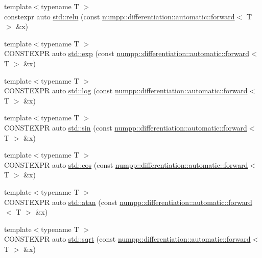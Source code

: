 \begin{DoxyCompactItemize}
\item 
{\footnotesize template$<$typename T $>$ }\\constexpr auto \hyperlink{group__numpp__differentiation__forward__automatic_ga2faff4e6f917370493a6c12f947e2573}{std\+::relu} (const \hyperlink{classnumpp_1_1differentiation_1_1automatic_1_1forward}{numpp\+::differentiation\+::automatic\+::forward}$<$ T $>$ \&x)
\item 
{\footnotesize template$<$typename T $>$ }\\C\+O\+N\+S\+T\+E\+X\+PR auto \hyperlink{group__numpp__differentiation__forward__automatic_gab45ba058e4fd16d0f9f4c26426e385f9}{std\+::exp} (const \hyperlink{classnumpp_1_1differentiation_1_1automatic_1_1forward}{numpp\+::differentiation\+::automatic\+::forward}$<$ T $>$ \&x)
\item 
{\footnotesize template$<$typename T $>$ }\\C\+O\+N\+S\+T\+E\+X\+PR auto \hyperlink{group__numpp__differentiation__forward__automatic_ga0f6011595edffe756a984de60358fe5f}{std\+::log} (const \hyperlink{classnumpp_1_1differentiation_1_1automatic_1_1forward}{numpp\+::differentiation\+::automatic\+::forward}$<$ T $>$ \&x)
\item 
{\footnotesize template$<$typename T $>$ }\\C\+O\+N\+S\+T\+E\+X\+PR auto \hyperlink{group__numpp__differentiation__forward__automatic_ga6f6f07250087b18ada9ea1f84418f24f}{std\+::sin} (const \hyperlink{classnumpp_1_1differentiation_1_1automatic_1_1forward}{numpp\+::differentiation\+::automatic\+::forward}$<$ T $>$ \&x)
\item 
{\footnotesize template$<$typename T $>$ }\\C\+O\+N\+S\+T\+E\+X\+PR auto \hyperlink{group__numpp__differentiation__forward__automatic_gaa5a06320f93037d94fda441546d7d690}{std\+::cos} (const \hyperlink{classnumpp_1_1differentiation_1_1automatic_1_1forward}{numpp\+::differentiation\+::automatic\+::forward}$<$ T $>$ \&x)
\item 
{\footnotesize template$<$typename T $>$ }\\C\+O\+N\+S\+T\+E\+X\+PR auto \hyperlink{group__numpp__differentiation__forward__automatic_ga9547d13665c214d44b017b140ccc1a3e}{std\+::atan} (const \hyperlink{classnumpp_1_1differentiation_1_1automatic_1_1forward}{numpp\+::differentiation\+::automatic\+::forward}$<$ T $>$ \&x)
\item 
{\footnotesize template$<$typename T $>$ }\\C\+O\+N\+S\+T\+E\+X\+PR auto \hyperlink{group__numpp__differentiation__forward__automatic_ga9c142d0a384bfa6e79bf6f614c98fe1d}{std\+::sqrt} (const \hyperlink{classnumpp_1_1differentiation_1_1automatic_1_1forward}{numpp\+::differentiation\+::automatic\+::forward}$<$ T $>$ \&x)

\end{DoxyCompactItemize}
